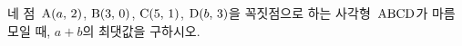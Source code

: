 네 점~$\mathrm{A}(a,\,2)$, $\mathrm{B}(3,\,0)$, $\mathrm{C}(5,\,1)$, $\mathrm{D}(b,\,3)$을 꼭짓점으로 하는 사각형~$\mathrm{ABCD}$가 마름모일 때, $a+b$의 최댓값을 구하시오.
